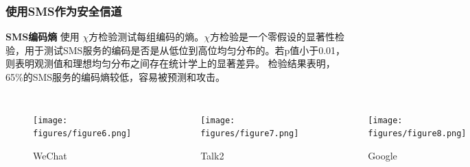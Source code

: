 \documentclass[10pt,aspectratio=43,mathserif]{beamer}
\begin{document}
\begin{frame}
    \frametitle{\textbf{使用SMS作为安全信道}}
    \begin{block}{\textbf{SMS编码熵}}
        使用 $\chi$方检验测试每组编码的熵。$\chi$方检验是一个零假设的显著性检验，用于测试SMS服务的编码是否是从低位到高位均匀分布的。若p值小于0.01，则表明观测值和理想均匀分布之间存在统计学上的显著差异。
        检验结果表明，65\%的SMS服务的编码熵较低，容易被预测和攻击。
    \end{block}
    \begin{columns}
        \begin{figure}
            \centering
            \texttt{[image: figures/figure6.png]}
            \caption{WeChat}
            \label{figure6_WeChat}
        \end{figure}

        \begin{figure}
            \centering
            \texttt{[image: figures/figure7.png]}
            \caption{Talk2}
            \label{figure3_Talk2}
        \end{figure}

        \begin{figure}
            \centering
            \texttt{[image: figures/figure8.png]}
            \caption{Google}
            \label{figure3_Google}
        \end{figure}
    \end{columns}
\end{frame}
\end{document}
